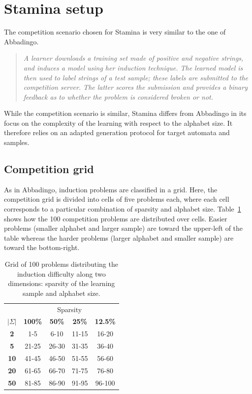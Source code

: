 \section{Stamina setup\label{section:stamina-setup}}

The competition scenario chosen for Stamina is very similar to the one of Abbadingo.

\begin{quotation}\emph{
A learner downloads a training set made of positive and negative strings, and induces a model using her induction technique. The learned model is then used to label strings of a test sample; these labels are submitted to the competition server. The latter scores the submission and provides a binary feedback as to whether the problem is considered broken or not.
}\end{quotation}

While the competition scenario is similar, Stamina differs from Abbadingo in its focus on the complexity of the learning with respect to the alphabet size. It therefore relies on an adapted generation protocol for target automata and samples.

\subsection{Competition grid}

As in Abbadingo, induction problems are classified in a grid. Here, the competition grid is divided into cells of five problems each, where each cell corresponds to a particular combination of sparsity and alphabet size. Table~\ref{stamina:table:problem-grid} shows how the 100 competition problems are distributed over cells. Easier problems (smaller alphabet and larger sample) are toward the upper-left of the table whereas the harder problems (larger alphabet and smaller sample) are toward the bottom-right.

\begin{table}[h]
\begin{center}
\begin{tabular}{c|c c c c}
&\multicolumn{4}{|c}{Sparsity}\\ 
\textbf{$|\Sigma|$} & \textbf{100\%} & \textbf{50\%} & \textbf{25\%} & \textbf{12.5\%}\\
\hline
\textbf{2}  & 1-5   & 6-10  & 11-15 & 16-20 \\
\textbf{5}  & 21-25 & 26-30 & 31-35 & 36-40 \\
\textbf{10} & 41-45 & 46-50 & 51-55 & 56-60 \\
\textbf{20} & 61-65 & 66-70 & 71-75 & 76-80 \\
\textbf{50} & 81-85 & 86-90 & 91-95 & 96-100\\
\end{tabular}
\end{center}
\caption{\label{stamina:table:problem-grid}Grid of 100 problems distributing the induction difficulty along two dimensions: sparsity of the learning sample and alphabet size.}
\end{table}

